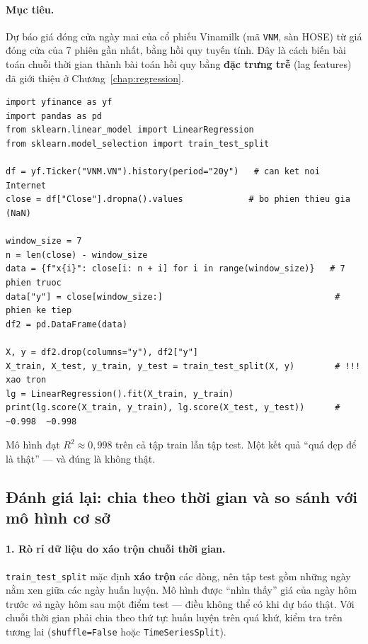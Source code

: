 \paragraph{Mục tiêu.} Dự báo giá đóng cửa ngày mai của cổ phiếu Vinamilk (mã \texttt{VNM}, sàn HOSE) từ giá đóng cửa của 7 phiên gần nhất, bằng hồi quy tuyến tính. Đây là cách biến bài toán chuỗi thời gian thành bài toán hồi quy bằng \textbf{đặc trưng trễ} (lag features) đã giới thiệu ở Chương~\ref{chap:regression}.

\begin{lstlisting}[caption={Lab 4 -- tải dữ liệu và tạo cửa sổ trượt 7 phiên}]
import yfinance as yf
import pandas as pd
from sklearn.linear_model import LinearRegression
from sklearn.model_selection import train_test_split

df = yf.Ticker("VNM.VN").history(period="20y")   # can ket noi Internet
close = df["Close"].dropna().values             # bo phien thieu gia (NaN)

window_size = 7
n = len(close) - window_size
data = {f"x{i}": close[i: n + i] for i in range(window_size)}   # 7 phien truoc
data["y"] = close[window_size:]                                  # phien ke tiep
df2 = pd.DataFrame(data)

X, y = df2.drop(columns="y"), df2["y"]
X_train, X_test, y_train, y_test = train_test_split(X, y)        # !!! xao tron
lg = LinearRegression().fit(X_train, y_train)
print(lg.score(X_train, y_train), lg.score(X_test, y_test))      # ~0.998  ~0.998
\end{lstlisting}


Mô hình đạt $R^2 \approx 0{,}998$ trên cả tập train lẫn tập test. Một kết quả ``quá đẹp để là thật'' --- và đúng là không thật.

\subsection{Đánh giá lại: chia theo thời gian và so sánh với mô hình cơ sở}

\paragraph{1. Rò rỉ dữ liệu do xáo trộn chuỗi thời gian.} \texttt{train\_test\_split} mặc định \textbf{xáo trộn} các dòng, nên tập test gồm những ngày nằm xen giữa các ngày huấn luyện. Mô hình được ``nhìn thấy'' giá của ngày hôm trước \textit{và} ngày hôm sau một điểm test --- điều không thể có khi dự báo thật. Với chuỗi thời gian phải chia theo thứ tự: huấn luyện trên quá khứ, kiểm tra trên tương lai (\texttt{shuffle=False} hoặc \texttt{TimeSeriesSplit}).


